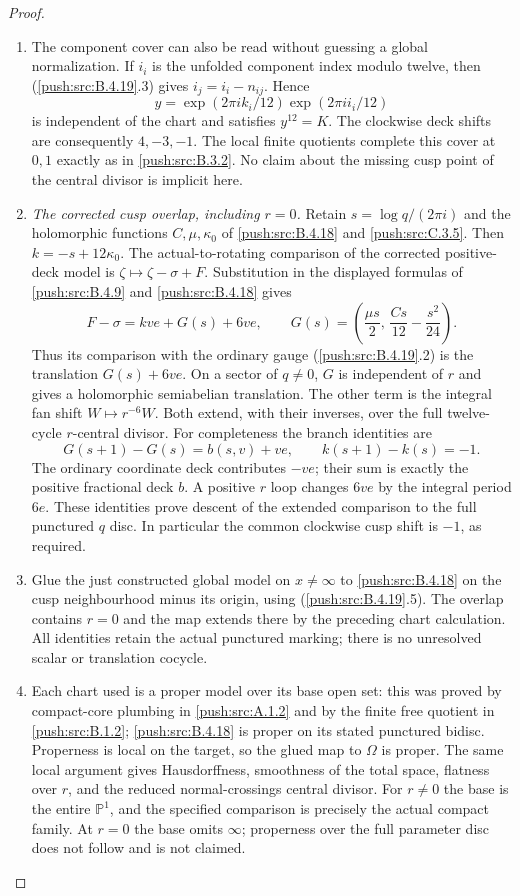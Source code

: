 \begin{proof}
\begin{enumerate}[label=\arabic*.,leftmargin=*]
\item The component cover can also be read without
guessing a global normalization. If $i_i$ is the
unfolded component index modulo twelve, then
(\ref{push:src:B.4.19}.3) gives $i_j=i_i-n_{ij}$. Hence
\[
 y=\exp(2\pi i k_i/12)\exp(2\pi i i_i/12)
\]
is independent of the chart and satisfies $y^{12}=K$.
The clockwise deck shifts are consequently $4,-3,-1$.
The local finite quotients complete this cover at
$0,1$ exactly as in \ref{push:src:B.3.2}. No claim about the missing
cusp point of the central divisor is implicit here.

\item \emph{The corrected cusp overlap, including $r=0$.}
Retain $s=\log q/(2\pi i)$ and the holomorphic
functions $C,\mu,\kappa_0$ of \ref{push:src:B.4.18} and \ref{push:src:C.3.5}.
Then $k=-s+12\kappa_0$. The actual-to-rotating
comparison of the corrected positive-deck model is
$\zeta\mapsto\zeta-\sigma+F$. Substitution in the
displayed formulas of \ref{push:src:B.4.9} and \ref{push:src:B.4.18} gives
\[
 F-\sigma=kve+G(s)+6ve,
 \qquad
 G(s)=\left(\frac{\mu s}{2},\,
                    \frac{Cs}{12}-\frac{s^2}{24}\right).
 \tag{B.4.19.5}
\]
Thus its comparison with the ordinary gauge
(\ref{push:src:B.4.19}.2) is the translation $G(s)+6ve$.
On a sector of $q\ne0$, $G$ is independent of $r$
and gives a holomorphic semiabelian translation.
The other term is the integral fan shift
$W\mapsto r^{-6}W$. Both extend, with their inverses,
over the full twelve-cycle $r$-central divisor.
For completeness the branch identities are
\[
 G(s+1)-G(s)=b(s,v)+ve,
 \qquad k(s+1)-k(s)=-1.
\]
The ordinary coordinate deck contributes $-ve$;
their sum is exactly the positive fractional deck
$b$. A positive $r$ loop changes $6ve$ by the
integral period $6e$. These identities prove
descent of the extended comparison to the full
punctured $q$ disc. In particular the common
clockwise cusp shift is $-1$, as required.

\item Glue the just constructed global model on
$x\ne\infty$ to \ref{push:src:B.4.18} on the cusp neighbourhood
minus its origin, using (\ref{push:src:B.4.19}.5). The overlap
contains $r=0$ and the map extends there by the
preceding chart calculation. All identities
retain the actual punctured marking; there is no
unresolved scalar or translation cocycle.

\item Each chart used is a proper model over its base
open set: this was proved by compact-core plumbing
in \ref{push:src:A.1.2} and by the finite free quotient in \ref{push:src:B.1.2};
\ref{push:src:B.4.18} is proper on its stated punctured bidisc.
Properness is local on the target, so the glued
map to $\Omega$ is proper. The same local argument
gives Hausdorffness, smoothness of the total space,
flatness over $r$, and the reduced normal-crossings
central divisor. For $r\ne0$ the base is the entire
$\mathbb P^1$, and the specified comparison is
precisely the actual compact family. At $r=0$ the
base omits $\infty$; properness over the full
parameter disc does not follow and is not claimed.


\end{enumerate}
\end{proof}
